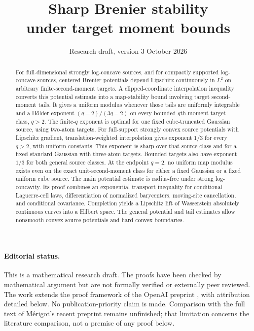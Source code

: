 \documentclass[11pt]{article}
\title{Sharp Brenier stability\\under target moment bounds}
\author{}
\date{Research draft, version 3\quad 7 October 2026}
\numberwithin{equation}{section}
\theoremstyle{remark}
\begin{document}
\maketitle
\vspace{-1.5em}
\begin{abstract}
For full-dimensional strongly log-concave sources, and for compactly supported log-concave sources, centered Brenier potentials depend Lipschitz-continuously in $L^2$ on arbitrary finite-second-moment targets. A clipped-coordinate interpolation inequality converts this potential estimate into a map-stability bound involving target second-moment tails. It gives a uniform modulus whenever those tails are uniformly integrable and a H\"older exponent $(q-2)/(3q-2)$ on every bounded $q$th-moment target class, $q>2$. The finite-$q$ exponent is optimal for one fixed cube-truncated Gaussian source, using two-atom targets. For full-support strongly convex source potentials with Lipschitz gradient, translation-weighted interpolation gives exponent $1/3$ for every $q>2$, with uniform constants. This exponent is sharp over that source class and for a fixed standard Gaussian with three-atom targets. Bounded targets also have exponent $1/3$ for both general source classes. At the endpoint $q=2$, no uniform map modulus exists even on the exact unit-second-moment class for either a fixed Gaussian or a fixed uniform cube source. The main potential estimate is radius-free under strong log-concavity. Its proof combines an exponential transport inequality for conditional Laguerre-cell laws, differentiation of normalized barycenters, moving-site cancellation, and conditional covariance. Completion yields a Lipschitz lift of Wasserstein absolutely continuous curves into a Hilbert space. The general potential and tail estimates allow nonsmooth convex source potentials and hard convex boundaries.
\end{abstract}

\paragraph{Editorial status.}
This is a mathematical research draft. The proofs have been checked by mathematical argument but are not formally verified or externally peer reviewed. The work extends the proof framework of the OpenAI preprint \cite{OpenAI2026}, with attribution detailed below. No publication-priority claim is made. Comparison with the full text of M\'erigot's recent preprint \cite{Merigot2026} remains unfinished; that limitation concerns the literature comparison, not a premise of any proof below.
\end{document}
